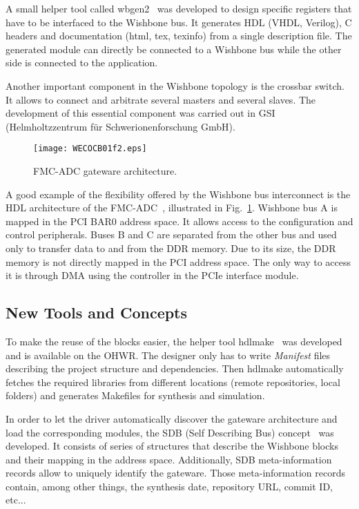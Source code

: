 \documentclass{JAC2003}
\begin{document}
A small helper tool called wbgen2~\cite{wbgen2} was developed to design specific registers that have to be interfaced to the Wishbone bus.
It generates HDL (VHDL, Verilog), C headers and documentation (html, tex, texinfo) from a single description file.
The generated module can directly be connected to a Wishbone bus while the other side is connected to the application.

Another important component in the Wishbone topology is the crossbar switch.
It allows to connect and arbitrate several masters and several slaves.
The development of this essential component was carried out in GSI (Helmholtzzentrum f\"ur Schwerionenforschung GmbH).

\begin{figure}[htb]
   \centering
   \texttt{[image: WECOCB01f2.eps]}
   \caption{FMC-ADC gateware architecture.}
   \label{spec-fmc-adc_arch}
\end{figure}

A good example of the flexibility offered by the Wishbone bus interconnect is the HDL architecture of the FMC-ADC~\cite{fmc-adc}, illustrated in Fig.~\ref{spec-fmc-adc_arch}.
Wishbone bus A is mapped in the PCI BAR0 address space.
It allows access to the configuration and control peripherals.
Buses B and C are separated from the other bus and used only to transfer data to and from the DDR memory.
Due to its size, the DDR memory is not directly mapped in the PCI address space.
The only way to access it is through DMA using the controller in the PCIe interface module.

\subsection{New Tools and Concepts}
To make the reuse of the blocks easier, the helper tool hdlmake~\cite{hdlmake} was developed and is available on the OHWR.
The designer only has to write \textit{Manifest} files describing the project structure and dependencies.
Then hdlmake automatically fetches the required libraries from different locations (remote repositories, local folders) and generates Makefiles for synthesis and simulation.

In order to let the driver automatically discover the gateware architecture and load the corresponding modules, the SDB (Self Describing Bus) concept~\cite{sdb} was developed.
It consists of series of structures that describe the Wishbone blocks and their mapping in the address space.
Additionally, SDB meta-information records allow to uniquely identify the gateware.
Those meta-information records contain, among other things, the synthesis date, repository URL, commit ID, etc...
\end{document}
